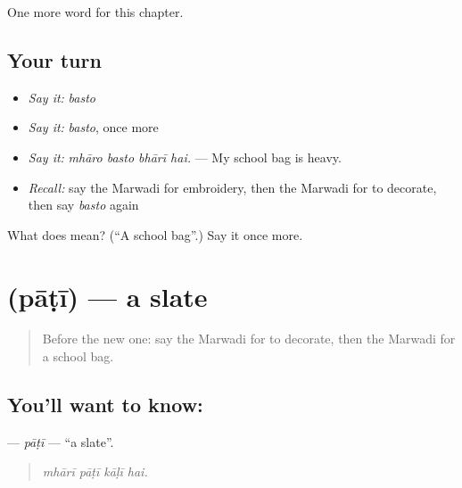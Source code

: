 \begin{grammarlens}[title={What you've built}]
One more word for this chapter.
\end{grammarlens}

\subsection*{Your turn}
\begin{itemize}
\raggedright
  \item \emph{Say it:} \emph{basto}
  \item \emph{Say it:} \emph{basto}, once more
  \item \emph{Say it:} \emph{mhāro basto bhārī hai.} — My school bag is heavy.
  \item \emph{Recall:} say the Marwadi for embroidery, then the Marwadi for to decorate, then say \emph{basto} again
\end{itemize}

\begin{tcolorbox}[breakable,colback=teal!4,colframe=teal!35!black,title={Before you move on}]
What does  mean? (\textquotedblleft{}A school bag\textquotedblright{}.) Say it once more.
\end{tcolorbox}
\section[\texorpdfstring{\mw{पाटी} (pāṭī)}{पाटी (pāṭī)}]{ (pāṭī) — a slate}

\label{lesson:MW-C284-pati}



\begin{quote}
Before the new one: say the Marwadi for to decorate, then the Marwadi for a school bag.
\end{quote}

\subsection*{You'll want to know: }
\textbf{} — \emph{pāṭī} — \textquotedblleft{}a slate\textquotedblright{}.

\begin{quote}
   
\end{quote}

\begin{quote}
\emph{mhārī pāṭī kāḷī hai.}
\end{quote}

